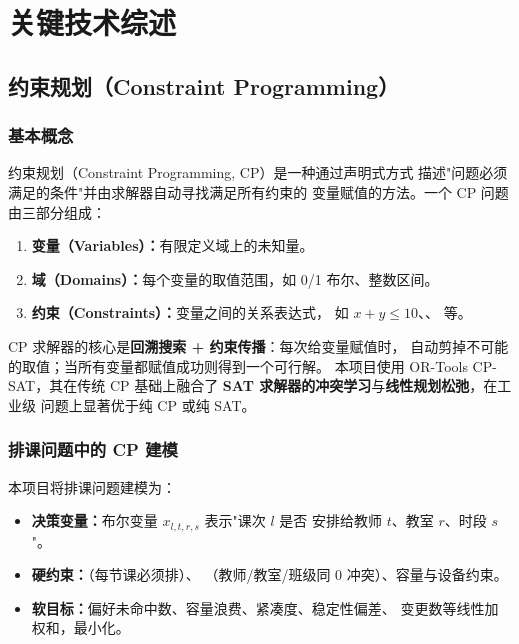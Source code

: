 ﻿%
\section{关键技术综述}

\subsection{约束规划（Constraint Programming）}

\subsubsection{基本概念}

约束规划（Constraint Programming, CP）是一种通过声明式方式
描述"问题必须满足的条件"并由求解器自动寻找满足所有约束的
变量赋值的方法。一个 CP 问题由三部分组成：
\begin{enumerate}[leftmargin=2em,itemsep=0.2em]
\item \textbf{变量（Variables）：}有限定义域上的未知量。
\item \textbf{域（Domains）：}每个变量的取值范围，如 0/1 布尔、整数区间。
\item \textbf{约束（Constraints）：}变量之间的关系表达式，
如 $x + y \leq 10$、、 等。
\end{enumerate}

CP 求解器的核心是\textbf{回溯搜索 + 约束传播}：每次给变量赋值时，
自动剪掉不可能的取值；当所有变量都赋值成功则得到一个可行解。
本项目使用 OR-Tools CP-SAT，其在传统 CP 基础上融合了
\textbf{SAT 求解器的冲突学习}与\textbf{线性规划松弛}，在工业级
问题上显著优于纯 CP 或纯 SAT。

\subsubsection{排课问题中的 CP 建模}

本项目将排课问题建模为：
\begin{itemize}[leftmargin=2em,itemsep=0.1em]
\item \textbf{决策变量：}布尔变量 $x_{l,t,r,s}$ 表示"课次 $l$ 是否
安排给教师 $t$、教室 $r$、时段 $s$"。
\item \textbf{硬约束：}（每节课必须排）、
（教师/教室/班级同 0 冲突）、容量与设备约束。
\item \textbf{软目标：}偏好未命中数、容量浪费、紧凑度、稳定性偏差、
变更数等线性加权和，最小化。
\end{itemize}

